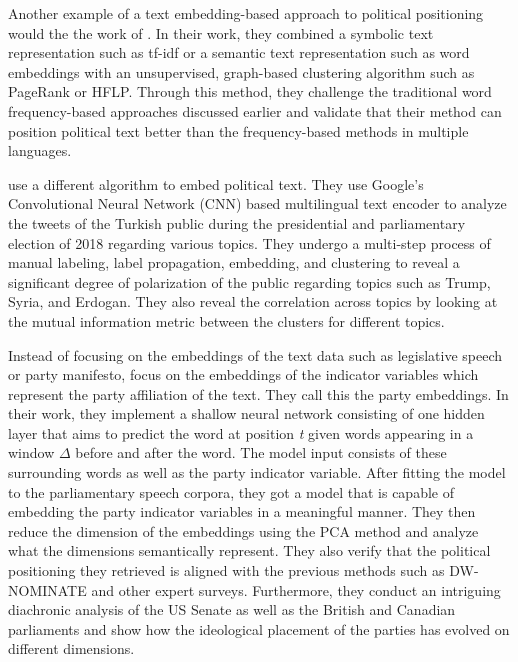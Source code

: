 \documentclass[final,5p,times,twocolumn,authoryear]{elsarticle}
\begin{document}
Another example of a text embedding-based approach to political positioning would the the work of \citeauthor{Political-Text-Scaling-Meets-Computational-Semantics}. In their work, they combined a symbolic text representation such as tf-idf or a semantic text representation such as word embeddings with an unsupervised, graph-based clustering algorithm such as PageRank or HFLP. Through this method, they challenge the traditional word frequency-based approaches discussed earlier and validate that their method can position political text better than the frequency-based methods in multiple languages.

\citeauthor{Embeddings-Based-Clustering-for-Target-Specific-Stances} use a different algorithm to embed political text. They use Google's Convolutional Neural Network (CNN) based multilingual text encoder to analyze the tweets of the Turkish public during the presidential and parliamentary election of 2018 regarding various topics. They undergo a multi-step process of manual labeling, label propagation, embedding, and clustering to reveal a significant degree of polarization of the public regarding topics such as Trump, Syria, and Erdogan. They also reveal the correlation across topics by looking at the mutual information metric between the clusters for different topics.

Instead of focusing on the embeddings of the text data such as legislative speech or party manifesto, \citeauthor{Word-embeddings-for-analysis-of-ideological-placement} focus on the embeddings of the indicator variables which represent the party affiliation of the text. They call this the party embeddings. In their work, they implement a shallow neural network consisting of one hidden layer that aims to predict the word at position \textit{t} given words appearing in a window $\Delta$ before and after the word. The model input consists of these surrounding words as well as the party indicator variable. After fitting the model to the parliamentary speech corpora, they got a model that is capable of embedding the party indicator variables in a meaningful manner. They then reduce the dimension of the embeddings using the PCA method and analyze what the dimensions semantically represent. They also verify that the political positioning they retrieved is aligned with the previous methods such as DW-NOMINATE and other expert surveys. Furthermore, they conduct an intriguing diachronic analysis of the US Senate as well as the British and Canadian parliaments and show how the ideological placement of the parties has evolved on different dimensions. 
\end{document}
